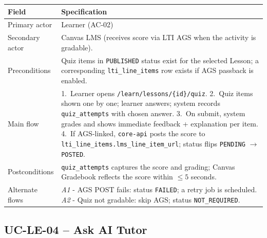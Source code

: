 \begin{longtable}{|p{3.2cm}|p{10.3cm}|}
\hline
\textbf{Field} & \textbf{Specification} \\
\hline
\endhead
Primary actor & Learner (AC-02) \\
\hline
Secondary actor & Canvas LMS (receives score via LTI AGS when the
    activity is gradable). \\
\hline
Preconditions & Quiz items in \texttt{PUBLISHED} status exist for the
    selected Lesson; a corresponding \texttt{lti\_line\_items} row
    exists if AGS passback is enabled. \\
\hline
Main flow &
    1.\ Learner opens \texttt{/learn/lessons/\{id\}/quiz}.
    2.\ Quiz items shown one by one; learner answers; system records
    \texttt{quiz\_attempts} with chosen answer.
    3.\ On submit, system grades and shows immediate feedback +
    explanation per item.
    4.\ If AGS-linked, \texttt{core-api} posts the score to
    \texttt{lti\_line\_items.lms\_line\_item\_url}; status flips
    \texttt{PENDING} $\to$ \texttt{POSTED}. \\
\hline
Postconditions & \texttt{quiz\_attempts} captures the score and
    grading; Canvas Gradebook reflects the score within $\leq 5$
    seconds. \\
\hline
Alternate flows &
    \emph{A1} - AGS POST fails: status \texttt{FAILED}; a retry job is
    scheduled.
    \emph{A2} - Quiz not gradable: skip AGS; status
    \texttt{NOT\_REQUIRED}. \\
\hline
\end{longtable}

\subsection*{UC-LE-04 -- Ask AI Tutor}

